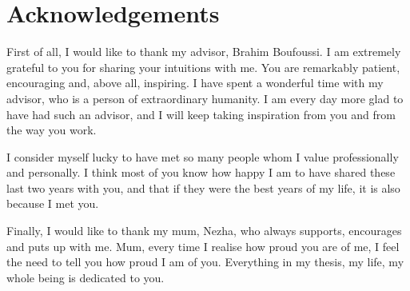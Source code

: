 \chapter*{Acknowledgements}
First of all, I would like to thank my advisor, Brahim Boufoussi. I am
extremely grateful to you for sharing your intuitions with me. You are
remarkably patient, encouraging and, above all, inspiring. I have spent a
wonderful time with my advisor, who is a person of extraordinary humanity. I
am every day more glad to have had such an advisor, and I will keep taking
inspiration from you and from the way you work.

I consider myself lucky to have met so many people whom I value
professionally and personally. I think most of you know how happy I am to have
shared these last two years with you, and that if they were the best years of
my life, it is also because I met you.

Finally, I would like to thank my mum, Nezha, who always supports, encourages
and puts up with me. Mum, every time I realise how proud you are of me, I feel
the need to tell you how proud I am of you. Everything in my thesis, my life,
my whole being is dedicated to you.
